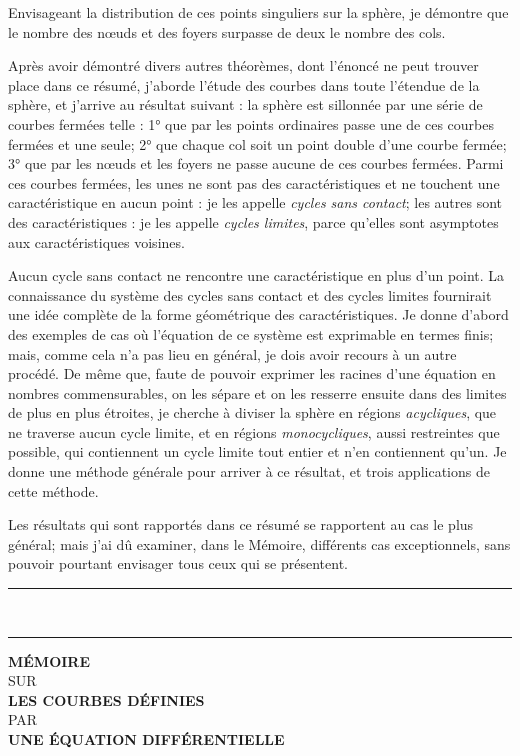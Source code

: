 \documentclass[11pt]{article}
\newcommand{\ornament}{\begin{center}\rule{2.5em}{0.4pt}\,\raisebox{0.1ex}{\tiny$\bullet\bullet\bullet$}\,\rule{2.5em}{0.4pt}\end{center}}
\begin{document}
Envisageant la distribution de ces points singuliers sur la sphère, je démontre que le nombre des nœuds et des foyers surpasse de deux le nombre des cols.

Après avoir démontré divers autres théorèmes, dont l’énoncé ne peut trouver place dans ce résumé, j’aborde l’étude des courbes dans toute l’étendue de la sphère, et j’arrive au résultat suivant : la sphère est sillonnée par une série de courbes fermées telle : 1° que par les points ordinaires passe une de ces courbes fermées et une seule; 2° que chaque col soit un point double d’une courbe fermée; 3° que par les nœuds et les foyers ne passe aucune de ces courbes fermées. Parmi ces courbes fermées, les unes ne sont pas des caractéristiques et ne touchent une caractéristique en aucun point : je les appelle \emph{cycles sans contact}; les autres sont des caractéristiques : je les appelle \emph{cycles limites}, parce qu’elles sont asymptotes aux caractéristiques voisines.

Aucun cycle sans contact ne rencontre une caractéristique en plus d’un point. La connaissance du système des cycles sans contact et des cycles limites fournirait une idée complète de la forme géométrique des caractéristiques. Je donne d’abord des exemples de cas où l’équation de ce système est exprimable en termes finis; mais, comme cela n’a pas lieu en général, je dois avoir recours à un autre procédé. De même que, faute de pouvoir exprimer les racines d’une équation en nombres commensurables, on les sépare et on les resserre ensuite dans des limites de plus en plus étroites, je cherche à diviser la sphère en régions \emph{acycliques}, que ne traverse aucun cycle limite, et en régions \emph{monocycliques}, aussi restreintes que possible, qui contiennent un cycle limite tout entier et n’en contiennent qu’un. Je donne une méthode générale pour arriver à ce résultat, et trois applications de cette méthode.

Les résultats qui sont rapportés dans ce résumé se rapportent au cas le plus général; mais j’ai dû examiner, dans le Mémoire, différents cas exceptionnels, sans pouvoir pourtant envisager tous ceux qui se présentent.

\ornament

\clearpage

\setcounter{footnote}{0}
\begin{center}
{\large\bfseries MÉMOIRE}\\[0.8em]
{\small SUR}\\[0.8em]
{\Large\bfseries LES COURBES DÉFINIES}\\[0.8em]
{\small PAR}\\[0.8em]
{\large\bfseries UNE ÉQUATION DIFFÉRENTIELLE}
\end{center}
\end{document}

